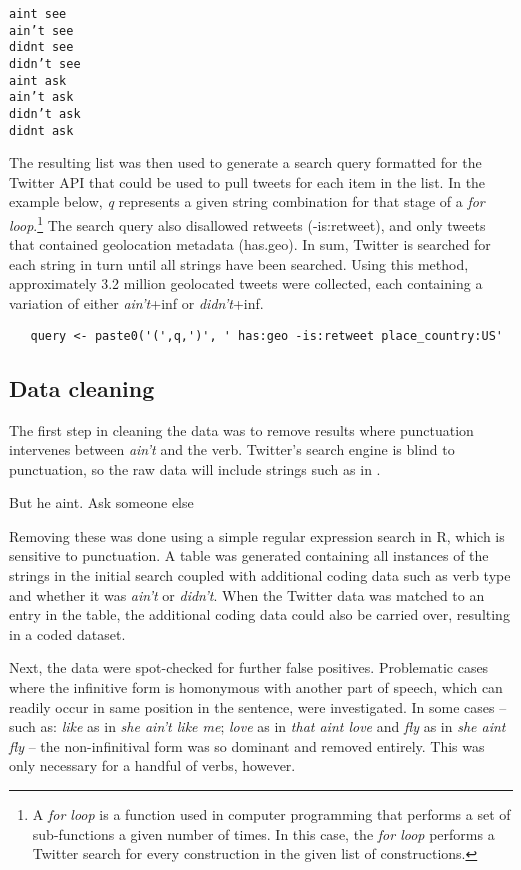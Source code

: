 \documentclass[output=paper,colorlinks,citecolor=brown,draftmode]{langscibook}
\begin{document}
\begin{verbatim}
aint see
ain’t see
didnt see
didn’t see
aint ask
ain’t ask
didn’t ask
didnt ask 
\end{verbatim}


The resulting list was then used to generate a search query formatted for the Twitter API that could be used to pull tweets for each item in the list. In the example below, \textit{q} represents a given string combination for that stage of a \textit{for loop}.\footnote{A \textit{for loop} is a function used in computer programming that performs a set of sub-functions a given number of times. In this case, the \textit{for loop} performs a Twitter search for every construction in the given list of constructions.} The search query also disallowed retweets (-is:retweet), and only tweets that contained geolocation metadata (has.geo). In sum, Twitter is searched for each string in turn until all strings have been searched. Using this method, approximately 3.2 million geolocated tweets were collected, each containing a variation of either \textit{ain't}+inf or \textit{didn't}+inf.


\begin{verbatim}
   query <- paste0('(',q,')', ' has:geo -is:retweet place_country:US' 
\end{verbatim}


\subsection{Data cleaning}
The first step in cleaning the data was to remove results where punctuation intervenes between \textit{ain't} and the verb. Twitter’s search engine is blind to punctuation, so the raw data will include strings such as in .

\ea \label{ex.punc} But he aint. Ask someone else
\z

Removing these was done using a simple regular expression search in R, which is sensitive to punctuation. A table was generated containing all instances of the strings in the initial search coupled with additional coding data such as verb type and whether it was \textit{ain't} or \textit{didn't}. When the Twitter data was matched to an entry in the table, the additional coding data could also be carried over, resulting in a coded dataset.


Next, the data were spot-checked for further false positives. Problematic cases where the infinitive form is homonymous with another part of speech, which can readily occur in same position in the sentence, were investigated. In some cases -- such as: \textit{like} as in \textit{she ain’t like me}; \textit{love} as in \textit{that aint love} and \textit{fly} as in \textit{she aint fly} -- the non-infinitival form was so dominant and removed entirely. This was only necessary for a handful of verbs, however.
\end{document}
